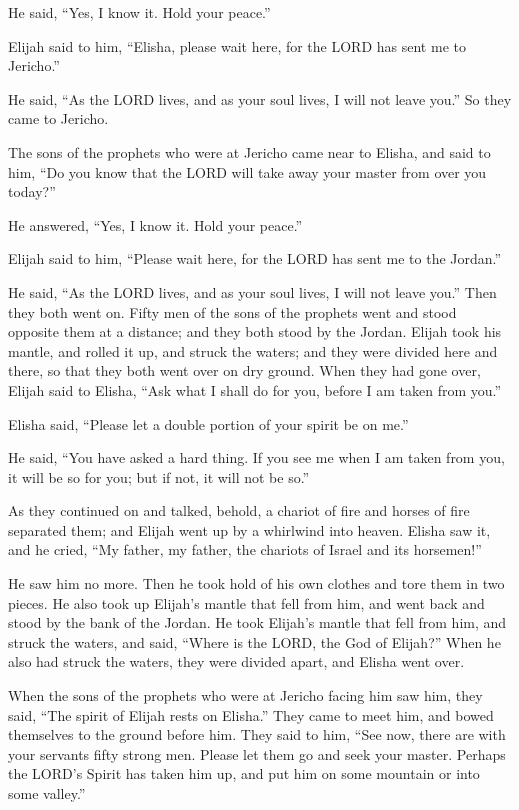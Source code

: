 He said, ``Yes, I know it. Hold your peace.''

 Elijah said to him, ``Elisha, please wait here, for the
LORD has sent me to Jericho.''

He said, ``As the LORD lives, and as your soul lives, I will not leave
you.'' So they came to Jericho.

 The sons of the prophets who were at Jericho came near to
Elisha, and said to him, ``Do you know that the LORD will take away your
master from over you today?''

He answered, ``Yes, I know it. Hold your peace.''

 Elijah said to him, ``Please wait here, for the LORD has
sent me to the Jordan.''

He said, ``As the LORD lives, and as your soul lives, I will not leave
you.'' Then they both went on.  Fifty men of the sons of the
prophets went and stood opposite them at a distance; and they both stood
by the Jordan.  Elijah took his mantle, and rolled it up,
and struck the waters; and they were divided here and there, so that
they both went over on dry ground.  When they had gone over,
Elijah said to Elisha, ``Ask what I shall do for you, before I am taken
from you.''

Elisha said, ``Please let a double portion of your spirit be on me.''

 He said, ``You have asked a hard thing. If you see me when
I am taken from you, it will be so for you; but if not, it will not be
so.''

 As they continued on and talked, behold, a chariot of fire
and horses of fire separated them; and Elijah went up by a whirlwind
into heaven.  Elisha saw it, and he cried, ``My father, my
father, the chariots of Israel and its horsemen!''

He saw him no more. Then he took hold of his own clothes and tore them
in two pieces.  He also took up Elijah's mantle that fell
from him, and went back and stood by the bank of the Jordan.
 He took Elijah's mantle that fell from him, and struck the
waters, and said, ``Where is the LORD, the God of Elijah?'' When he also
had struck the waters, they were divided apart, and Elisha went over.

 When the sons of the prophets who were at Jericho facing
him saw him, they said, ``The spirit of Elijah rests on Elisha.'' They
came to meet him, and bowed themselves to the ground before him.
 They said to him, ``See now, there are with your servants
fifty strong men. Please let them go and seek your master. Perhaps the
LORD's Spirit has taken him up, and put him on some mountain or into
some valley.''

